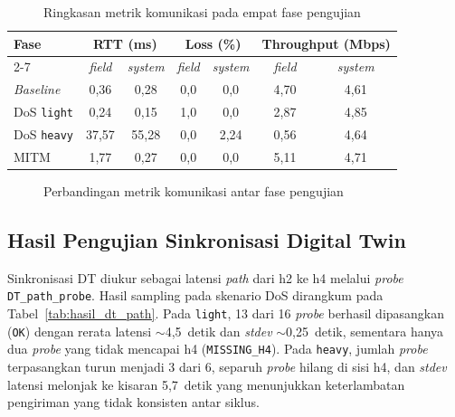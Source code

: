 \renewcommand{\arraystretch}{1.3}
\begin{table}[htbp]
    \centering
    \caption{Ringkasan metrik komunikasi pada empat fase pengujian}
    \label{tab:hasil_komunikasi}
    \begin{tabular}{|l|c|c|c|c|c|c|}
        \hline
        \multirow{2}{*}{\textbf{Fase}} & \multicolumn{2}{c|}{\textbf{RTT (ms)}} & \multicolumn{2}{c|}{\textbf{Loss (\%)}} & \multicolumn{2}{c|}{\textbf{Throughput (Mbps)}} \\ \cline{2-7}
         & \textit{field} & \textit{system} & \textit{field} & \textit{system} & \textit{field} & \textit{system} \\ \hline
        \textit{Baseline}     & 0{,}36  & 0{,}28  & 0{,}0  & 0{,}0  & 4{,}70 & 4{,}61 \\ \hline
        \ac{DoS} \texttt{light} & 0{,}24  & 0{,}15  & 1{,}0  & 0{,}0  & 2{,}87 & 4{,}85 \\ \hline
        \ac{DoS} \texttt{heavy} & 37{,}57 & 55{,}28 & 0{,}0  & 2{,}24 & 0{,}56 & 4{,}64 \\ \hline
        \ac{MITM}             & 1{,}77  & 0{,}27  & 0{,}0  & 0{,}0  & 5{,}11 & 4{,}71 \\ \hline
    \end{tabular}
\end{table}

\begin{figure}[htbp]
    \centering
    \caption{Perbandingan metrik komunikasi antar fase pengujian}
    \label{fig:hasil_komunikasi_bar}
\end{figure}

\subsection{Hasil Pengujian Sinkronisasi Digital Twin}
\label{subsec:hasil_pengujian_sinkronisasi_digital_twin}
Sinkronisasi \ac{DT} diukur sebagai latensi \textit{path} dari h2 ke h4 melalui \textit{probe} \texttt{DT\_path\_probe}. Hasil sampling pada skenario \ac{DoS} dirangkum pada Tabel~\ref{tab:hasil_dt_path}. Pada \texttt{light}, 13 dari 16 \textit{probe} berhasil dipasangkan (\texttt{OK}) dengan rerata latensi $\sim$4{,}5~detik dan \textit{stdev} $\sim$0{,}25~detik, sementara hanya dua \textit{probe} yang tidak mencapai h4 (\texttt{MISSING\_H4}). Pada \texttt{heavy}, jumlah \textit{probe} terpasangkan turun menjadi 3 dari 6, separuh \textit{probe} hilang di sisi h4, dan \textit{stdev} latensi melonjak ke kisaran 5{,}7~detik yang menunjukkan keterlambatan pengiriman yang tidak konsisten antar siklus.

